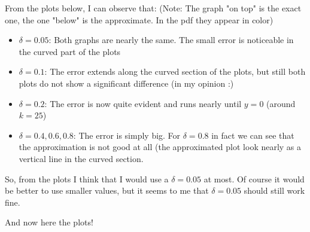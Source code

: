 \documentclass[10pt,a4paper]{article}
\begin{document}
From the plots below, I can observe that:
(Note: The graph "on top" is the exact one, the one  "below" is the approximate. In the pdf they appear in color)
\begin{itemize}
\item{$\delta = 0.05$:  Both graphs are nearly the same. The small error is noticeable in the curved part of the plots }
\item{$\delta = 0.1$: The error extends along the curved section of the plots, but still both plots do not show a significant difference (in my opinion :)}
\item{$\delta = 0.2$: The error is now quite evident and runs nearly until $y=0$ (around $k = 25$)}
\item{$\delta = 0.4, 0.6, 0.8$: The error is simply big. For $\delta = 0.8$ in fact we can see that the approximation is not good at all (the approximated plot look nearly as a vertical line in the curved section.}
\end{itemize}
 
So, from the plots I think that I would use a $\delta = 0.05$ at most. Of course it would be better to use smaller values, but it seems to me that $\delta = 0.05$ should still work fine.
\smallskip
 
And now here the plots!
\end{document}

